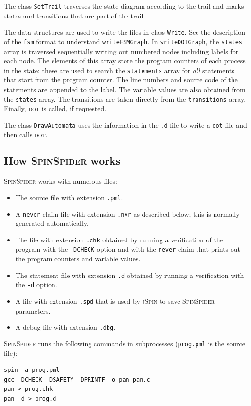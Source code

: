 \documentclass[11pt]{article}
\newcommand{\js}{\textsc{jSpin}}
\newcommand{\spd}{\textsc{SpinSpider}}
\newcommand{\dt}{\textsc{dot}}
\newcommand{\dtf}{\texttt{dot}}
\newcommand{\fsm}{\texttt{fsm}}
\newcommand{\p}[1]{\texttt{#1}}
\begin{document}
The class \p{SetTrail} traverses the state diagram according to the trail and
marks states and transitions that are part of the trail.

The data structures are used to write the files in class \p{Write}.
See the description of the \fsm{} format to understand \p{writeFSMGraph}.
In \p{writeDOTGraph}, the \p{states} array is traversed sequentially 
writing out numbered nodes including labels for each node. The 
elements of this array store the program counters of each process in the 
state; these are used to search the \p{statements} array for \emph{all} 
statements that start from the program counter. The line numbers and 
source code of the statements are appended to the label. The variable 
values are also obtained from the \p{states} array. The transitions are
taken directly from the \p{transitions} array. Finally, \dt{} is called, if
requested.

The class \p{DrawAutomata} uses the information in the \p{.d} file
to write a \dtf{} file and then calls \dt{}.

\subsection{How \spd{} works}\label{s.how}

\spd{} works with numerous files:
\begin{itemize}
\item The source file with extension \p{.pml}.
\item A \p{never} claim file with extension \p{.nvr} as described below;
this is normally generated automatically.
\item The file with extension \p{.chk} obtained by running a verification of 
the program with the \p{-DCHECK} option and with the \p{never} claim that 
prints out the program counters and variable values.
\item The statement file with extension \p{.d} obtained by running a verification
with the \p{-d} option.
\item A file with extension \p{.spd} that is used by \js{} to save \spd{} parameters.
\item A debug file with extension \p{.dbg}.
\end{itemize}

\spd{} runs the following commands in subprocesses (\p{prog.pml} is the source file):

\hspace*{1cm}\p{spin -a prog.pml}\\
\hspace*{1cm}\p{gcc -DCHECK -DSAFETY -DPRINTF -o pan pan.c}\\
\hspace*{1cm}\p{pan > prog.chk}\\
\hspace*{1cm}\p{pan -d > prog.d}
\end{document}
